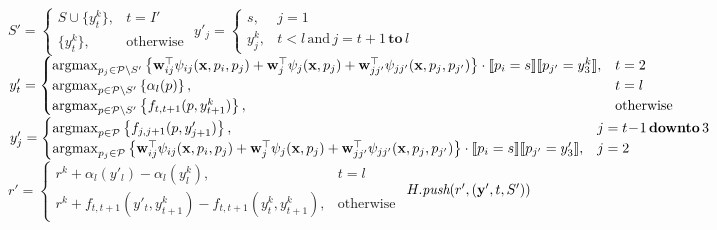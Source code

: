 \begin{algorithm}[htbp]
\begin{algorithmic}[1]
        \STATE $S' = \begin{cases}
                      S \cup \{ y_t^k \}, & t = I' \\
                      \{ y_t^k \},        & \text{otherwise}
                     \end{cases}$
        \STATE $y'_j = \begin{cases}
                        s,     & j = 1 \\
                        y_j^k, & t\!<\!l \, \text{and} \, j=t\!+\!1 \, \textbf{to} \, l
                       \end{cases}$
        \STATE $y'_t = \begin{cases}
                        \operatorname*{argmax}_{p_j \in \mathcal{P} \setminus S'} \left\{ \mathbf{w}_{ij}^\top \psi_{ij}(\mathbf{x}, p_i, p_j) + \mathbf{w}_j^\top \psi_j(\mathbf{x}, p_j) +
                                \mathbf{w}_{jj'}^\top \psi_{jj'}(\mathbf{x}, p_j, p_{j'}) \right\} \cdot \llbracket p_i = s \rrbracket \llbracket p_{j'} = y_3^k \rrbracket, & t=2 \\
                        \operatorname*{argmax}_{p \in \mathcal{P} \setminus S'} \left\{ \alpha_l(p) \right\}, & t=l \\
                        \operatorname*{argmax}_{p \in \mathcal{P} \setminus S'} \left\{ f_{t,t+1}(p, y_{t+1}^k) \right\}, & \text{otherwise}
                       \end{cases}$
            \STATE $y'_j = \begin{cases}
                            \operatorname*{argmax}_{p \in \mathcal{P}} \left\{ f_{j,j+1}(p, y'_{j+1}) \right\}, & j=t\!-\!1 \, \textbf{downto} \, 3\\
                            \operatorname*{argmax}_{p_j \in \mathcal{P}} \left\{ \mathbf{w}_{ij}^\top \psi_{ij}(\mathbf{x}, p_i, p_j) + \mathbf{w}_j^\top \psi_j(\mathbf{x}, p_j) +
                                    \mathbf{w}_{jj'}^\top \psi_{jj'}(\mathbf{x}, p_j, p_{j'}) \right\} \cdot \llbracket p_i = s \rrbracket \llbracket p_{j'} = y'_3 \rrbracket, & j = 2
                           \end{cases}$
        \ENDIF
        \STATE $r' = \begin{cases}
                      r^k + \alpha_l(y'_l) - \alpha_l(y_l^k), & t=l \\
                      r^k + f_{t,t+1}(y'_t, y_{t+1}^k) - f_{t,t+1}(y_t^k, y_{t+1}^k), & \text{otherwise}
                     \end{cases}$
        \STATE $H.\textit{push}(r', (\mathbf{y}', t, S') )$ 
    \ENDFOR
\ENDWHILE
\end{algorithmic}
\end{algorithm}
